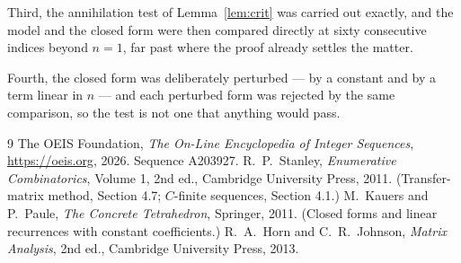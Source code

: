 \documentclass[11pt,a4paper]{article}
\theoremstyle{plain}
\theoremstyle{definition}
\begin{document}
Third, the annihilation test of Lemma~\ref{lem:crit} was carried out exactly, and the model
and the closed form were then compared directly at sixty consecutive indices beyond
$n=1$, far past where the proof already settles the matter.

Fourth, the closed form was deliberately perturbed --- by a constant and by a term linear in
$n$ --- and each perturbed form was rejected by the same comparison, so the test is not one
that anything would pass.

\begin{thebibliography}{9}
 The OEIS Foundation, \emph{The On-Line Encyclopedia of Integer
Sequences}, \url{https://oeis.org}, 2026. Sequence A203927.
 R.~P.~Stanley, \emph{Enumerative Combinatorics}, Volume 1, 2nd ed.,
Cambridge University Press, 2011. (Transfer-matrix method, Section 4.7; $C$-finite sequences,
Section 4.1.)
 M.~Kauers and P.~Paule, \emph{The Concrete Tetrahedron}, Springer, 2011.
(Closed forms and linear recurrences with constant coefficients.)
 R.~A.~Horn and C.~R.~Johnson, \emph{Matrix Analysis}, 2nd ed., Cambridge
University Press, 2013.
\end{thebibliography}
\end{document}
